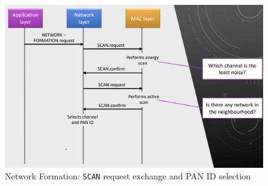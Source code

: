 \documentclass[10pt,a4paper]{report}
\theoremstyle{definition}
\begin{document}
\begin{figure}[h]
	\centering\includegraphics[scale=0.70]{images/Pasted image 20230311120710.png}
	\caption{Network Formation: \texttt{SCAN} request exchange and PAN ID selection}
	\label{network-formation}
\end{figure}
\end{document}
